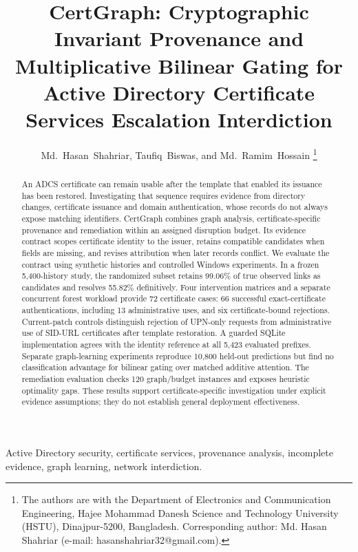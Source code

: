 \documentclass[journal]{IEEEtran}
\title{CertGraph: Cryptographic Invariant Provenance and Multiplicative Bilinear Gating for Active Directory Certificate Services Escalation Interdiction}
\author{Md.~Hasan~Shahriar, Taufiq~Biswas, and Md.~Ramim~Hossain%
\thanks{The authors are with the Department of Electronics and Communication Engineering, Hajee Mohammad Danesh Science and Technology University (HSTU), Dinajpur-5200, Bangladesh. Corresponding author: Md. Hasan Shahriar (e-mail: hasanshahriar32@gmail.com).}}
\begin{document}
\maketitle

\begin{abstract}
An ADCS certificate can remain usable after the template that enabled its issuance has been restored. Investigating that sequence requires evidence from directory changes, certificate issuance and domain authentication, whose records do not always expose matching identifiers. CertGraph combines graph analysis, certificate-specific provenance and remediation within an assigned disruption budget. Its evidence contract scopes certificate identity to the issuer, retains compatible candidates when fields are missing, and revises attribution when later records conflict. We evaluate the contract using synthetic histories and controlled Windows experiments. In a frozen 5,400-history study, the randomized subset retains 99.06\% of true observed links as candidates and resolves 55.82\% definitively. Four intervention matrices and a separate concurrent forest workload provide 72 certificate cases: 66 successful exact-certificate authentications, including 13 administrative uses, and six certificate-bound rejections. Current-patch controls distinguish rejection of UPN-only requests from administrative use of SID-URL certificates after template restoration. A guarded SQLite implementation agrees with the identity reference at all 5,423 evaluated prefixes. Separate graph-learning experiments reproduce 10,800 held-out predictions but find no classification advantage for bilinear gating over matched additive attention. The remediation evaluation checks 120 graph/budget instances and exposes heuristic optimality gaps. These results support certificate-specific investigation under explicit evidence assumptions; they do not establish general deployment effectiveness.
\end{abstract}

\begin{IEEEkeywords}
Active Directory security, certificate services, provenance analysis, incomplete evidence, graph learning, network interdiction.
\end{IEEEkeywords}










\end{document}
